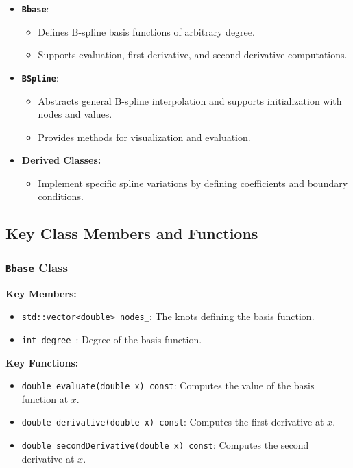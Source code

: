 \documentclass[a4paper]{article}
\begin{document}
\begin{itemize}
    \item \textbf{\texttt{Bbase}}:
    \begin{itemize}
        \item Defines B-spline basis functions of arbitrary degree.
        \item Supports evaluation, first derivative, and second derivative computations.
    \end{itemize}
    \item \textbf{\texttt{BSpline}}:
    \begin{itemize}
        \item Abstracts general B-spline interpolation and supports initialization with nodes and values.
        \item Provides methods for visualization and evaluation.
    \end{itemize}
    \item \textbf{Derived Classes:}
    \begin{itemize}
        \item Implement specific spline variations by defining coefficients and boundary conditions.
    \end{itemize}
\end{itemize}

\subsection{Key Class Members and Functions}

\subsubsection{\texttt{Bbase} Class}

\textbf{Key Members:}
\begin{itemize}
    \item \texttt{std::vector<double> nodes\_}: The knots defining the basis function.
    \item \texttt{int degree\_}: Degree of the basis function.
\end{itemize}

\textbf{Key Functions:}
\begin{itemize}
    \item \texttt{double evaluate(double x) const}:
    Computes the value of the basis function at $x$.
    \item \texttt{double derivative(double x) const}:
    Computes the first derivative at $x$.
    \item \texttt{double secondDerivative(double x) const}:
    Computes the second derivative at $x$.
\end{itemize}
\end{document}
